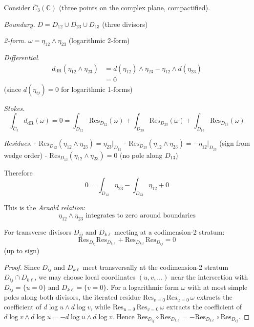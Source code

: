 \begin{example}\label{ex:stokes-three-points}
Consider $\overline{C}_3(\mathbb{C})$ (three points on the complex plane, compactified).

\emph{Boundary.} $D = D_{12} \cup D_{23} \cup D_{13}$ (three divisors)

\emph{2-form.} $\omega = \eta_{12} \wedge \eta_{23}$ (logarithmic 2-form)

\emph{Differential.} 
\begin{align*}
d_{\text{dR}}(\eta_{12} \wedge \eta_{23}) &= d(\eta_{12}) \wedge \eta_{23} - \eta_{12} \wedge d(\eta_{23}) \\
&= 0
\end{align*}
(since $d(\eta_{ij}) = 0$ for logarithmic 1-forms)

\emph{Stokes.}
\[\int_{\overline{C}_3} d_{\text{dR}}(\omega) = 0 = \int_{D_{12}} \text{Res}_{D_{12}}(\omega) + \int_{D_{23}} \text{Res}_{D_{23}}(\omega) + \int_{D_{13}} \text{Res}_{D_{13}}(\omega)\]

\emph{Residues.}
- $\text{Res}_{D_{12}}(\eta_{12} \wedge \eta_{23}) = \eta_{23}|_{D_{12}}$
- $\text{Res}_{D_{23}}(\eta_{12} \wedge \eta_{23}) = -\eta_{12}|_{D_{23}}$ (sign from wedge order)
- $\text{Res}_{D_{13}}(\eta_{12} \wedge \eta_{23}) = 0$ (no pole along $D_{13}$)

Therefore
\[0 = \int_{D_{12}} \eta_{23} - \int_{D_{23}} \eta_{12} + 0\]

This is the \emph{Arnold relation}:
\[\eta_{12} \wedge \eta_{23} \text{ integrates to zero around boundaries}\]
\end{example}

\begin{corollary}\label{cor:residues-anticommute}
For transverse divisors $D_{ij}$ and $D_{k\ell}$ meeting at a codimension-2 stratum:
\[\text{Res}_{D_{ij}} \text{Res}_{D_{k\ell}} + \text{Res}_{D_{k\ell}} \text{Res}_{D_{ij}} = 0\]
(up to sign)
\end{corollary}

\begin{proof}
Since $D_{ij}$ and $D_{k\ell}$ meet transversally at the codimension-2 stratum $D_{ij} \cap D_{k\ell}$, we may choose local coordinates $(u,v, \ldots)$ near the intersection with $D_{ij} = \{u = 0\}$ and $D_{k\ell} = \{v = 0\}$.  For a logarithmic form $\omega$ with at most simple poles along both divisors, the iterated residue $\mathrm{Res}_{v=0}\,\mathrm{Res}_{u=0}\,\omega$ extracts the coefficient of $d\log u \wedge d\log v$, while $\mathrm{Res}_{u=0}\,\mathrm{Res}_{v=0}\,\omega$ extracts the coefficient of $d\log v \wedge d\log u = -d\log u \wedge d\log v$.  Hence $\mathrm{Res}_{D_{ij}} \circ \mathrm{Res}_{D_{k\ell}} = -\mathrm{Res}_{D_{k\ell}} \circ \mathrm{Res}_{D_{ij}}$.
\end{proof}

